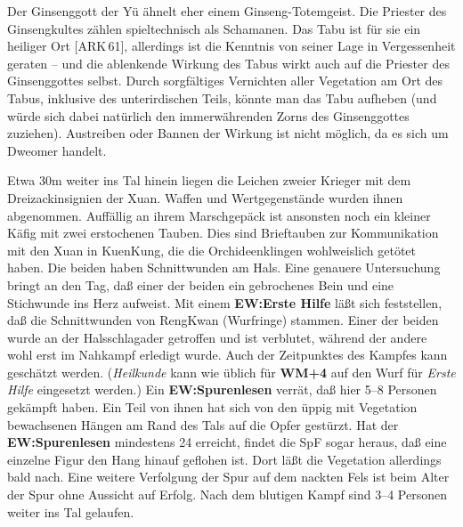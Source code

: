 \documentclass[
a4paper,
twoside,
DIV=calc,
BCOR=4mm,
fontsize=9pt,
twocolumn=on,
titlepage=on,
parskip=half
]{scrartcl}
\begin{document}
Der Ginsenggott der Yü ähnelt eher einem Ginseng-Totemgeist. Die
Priester des Ginsengkultes zählen spieltechnisch als Schamanen. Das
Tabu ist für sie ein heiliger Ort [ARK\,61], allerdings ist die
Kenntnis von seiner Lage in Vergessenheit geraten -- und die
ablenkende Wirkung des Tabus wirkt auch auf die Priester des
Ginsenggottes selbst. Durch sorgfältiges Vernichten aller Vegetation
am Ort des Tabus, inklusive des unterirdischen Teils, könnte man das
Tabu aufheben (und würde sich dabei natürlich den immerwährenden Zorns
des Ginsenggottes zuziehen). Austreiben oder Bannen der Wirkung ist
nicht möglich, da es sich um Dweomer handelt.

Etwa 30m weiter ins Tal hinein liegen die Leichen zweier Krieger mit
dem Dreizackinsignien der Xuan. Waffen und Wertgegenstände wurden
ihnen abgenommen. Auffällig an ihrem Marschgepäck ist ansonsten noch
ein kleiner Käfig mit zwei erstochenen Tauben. Dies sind Brieftauben
zur Kommunikation mit den Xuan in KuenKung, die die Orchideenklingen
wohlweislich getötet haben. Die beiden haben Schnittwunden am
Hals. Eine genauere Untersuchung bringt an den Tag, daß einer der
beiden ein gebrochenes Bein und eine Stichwunde ins Herz aufweist. Mit
einem \textbf{EW:Erste Hilfe} läßt sich feststellen, daß die
Schnittwunden von RengKwan (Wurfringe) stammen. Einer der beiden wurde
an der Halsschlagader getroffen und ist verblutet, während der andere
wohl erst im Nahkampf erledigt wurde. Auch der Zeitpunktes des Kampfes
kann geschätzt werden. (\emph{Heilkunde} kann wie üblich für
\textbf{WM+4} auf den Wurf für \emph{Erste Hilfe} eingesetzt werden.)
Ein \textbf{EW:Spurenlesen} verrät, daß hier 5--8 Personen gekämpft
haben. Ein Teil von ihnen hat sich von den üppig mit Vegetation
bewachsenen Hängen am Rand des Tals auf die Opfer gestürzt. Hat der
\textbf{EW:Spurenlesen} mindestens 24 erreicht, findet die SpF sogar
heraus, daß eine einzelne Figur den Hang hinauf geflohen ist. Dort
läßt die Vegetation allerdings bald nach. Eine weitere Verfolgung der
Spur auf dem nackten Fels ist beim Alter der Spur ohne Aussicht auf
Erfolg. Nach dem blutigen Kampf sind 3--4 Personen weiter ins Tal
gelaufen.
\end{document}
